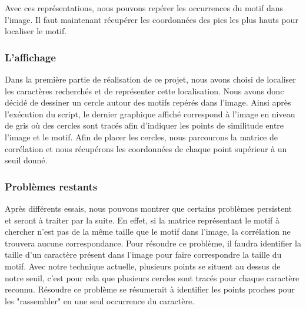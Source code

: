 \documentclass[a4paper,12pt,titlepage]{report}
\begin{document}
		Avec ces représentations, nous pouvons repérer les occurrences du motif dans l'image. Il faut maintenant récupérer les coordonnées des pics les plus hauts pour localiser le motif.
		\subsubsection{L'affichage}
		Dans la première partie de réalisation de ce projet, nous avons choisi de localiser les caractères recherchés et de représenter cette localisation. Nous avons donc décidé de dessiner un cercle autour des motifs repérés dans l'image.
		Ainsi après l'exécution du script, le dernier graphique affiché correspond à l'image en niveau de gris où des cercles sont tracés afin d'indiquer les points de similitude entre l'image et le motif.
		Afin de placer les cercles, nous parcourons la matrice de corrélation et nous récupérons les coordonnées de chaque point supérieur à un seuil donné. 

		\subsubsection{Problèmes restants}
		Après différents essais, nous pouvons montrer que certains problèmes persistent et seront à traiter par la suite.
		En effet, si la matrice représentant le motif à chercher n'est pas de la même taille que le motif dans l'image, la corrélation ne trouvera aucune correspondance. Pour résoudre ce problème, il faudra identifier la taille d'un caractère présent dans l'image pour faire correspondre la taille du motif.
		Avec notre technique actuelle, plusieurs points se situent au dessus de notre seuil, c'est pour cela que plusieurs cercles sont tracés pour chaque caractère reconnu. Résoudre ce problème se résumerait à identifier les points proches pour les "rassembler" en une seul occurrence du caractère.
\end{document}
